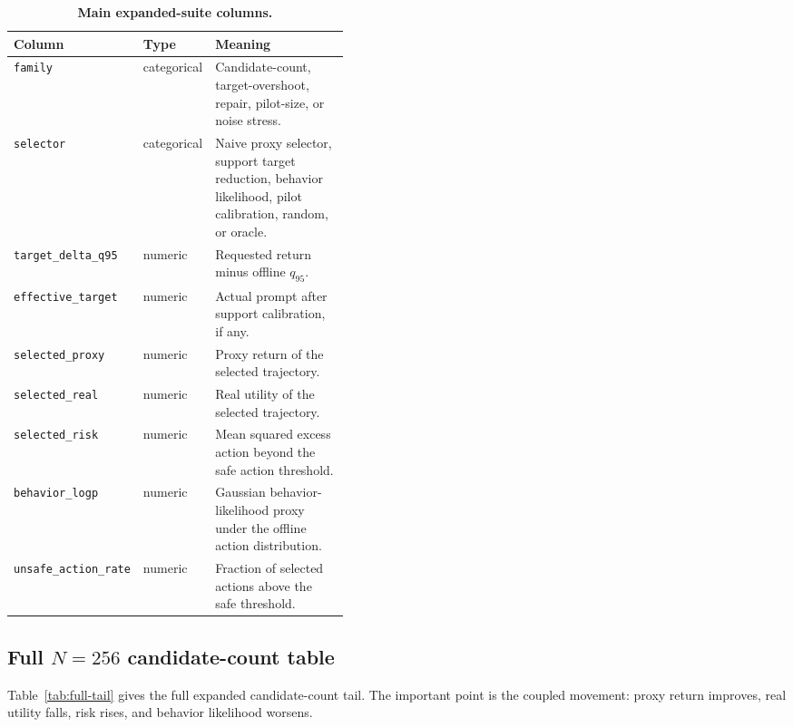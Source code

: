 \begin{table}[t]
\centering
\small
\caption{\textbf{Main expanded-suite columns.}}
\label{tab:schema}
\begin{tabularx}{\linewidth}{p{0.25\linewidth}p{0.18\linewidth}X}
\toprule
Column & Type & Meaning \\
\midrule
\texttt{family} & categorical & Candidate-count, target-overshoot, repair, pilot-size, or noise stress. \\
\texttt{selector} & categorical & Naive proxy selector, support target reduction, behavior likelihood, pilot calibration, random, or oracle. \\
\texttt{target\_delta\_q95} & numeric & Requested return minus offline $q_{95}$. \\
\texttt{effective\_target} & numeric & Actual prompt after support calibration, if any. \\
\texttt{selected\_proxy} & numeric & Proxy return of the selected trajectory. \\
\texttt{selected\_real} & numeric & Real utility of the selected trajectory. \\
\texttt{selected\_risk} & numeric & Mean squared excess action beyond the safe action threshold. \\
\texttt{behavior\_logp} & numeric & Gaussian behavior-likelihood proxy under the offline action distribution. \\
\texttt{unsafe\_action\_rate} & numeric & Fraction of selected actions above the safe threshold. \\
\bottomrule
\end{tabularx}
\end{table}

\subsection{Full \texorpdfstring{$N=256$}{N=256} candidate-count table}

Table~\ref{tab:full-tail} gives the full expanded candidate-count tail. The important point is the coupled movement: proxy return improves, real utility falls, risk rises, and behavior likelihood worsens.

